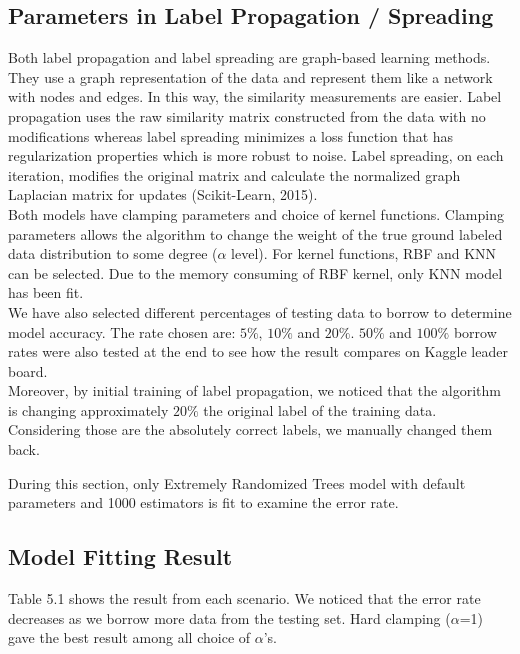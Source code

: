 \documentclass[11pt]{article}
\begin{document}
\subsection{Parameters in Label Propagation / Spreading}
Both label propagation and label spreading are graph-based learning methods. They use a graph representation of the data and represent them like a network with nodes and edges. In this way, the similarity measurements are easier. Label propagation uses the raw similarity matrix constructed from the data with no modifications whereas label spreading minimizes a loss function that has regularization properties which is more robust to noise. Label spreading, on each iteration, modifies the original matrix and calculate the normalized graph Laplacian matrix for updates (Scikit-Learn, 2015). \\

\noindent Both models have clamping parameters and choice of kernel functions. Clamping parameters allows the algorithm to change the weight of the true ground labeled data distribution to some degree ($\alpha$ level). For kernel functions, RBF and KNN can be selected. Due to the memory consuming of RBF kernel, only KNN model has been fit. \\

\noindent We have also selected different percentages of testing data to borrow to determine model accuracy. The rate chosen are: $5\%$, $10\%$ and $20\%$. $50\%$ and $100\%$ borrow rates were also tested at the end to see how the result compares on Kaggle leader board. \\

\noindent Moreover, by initial training of label propagation, we noticed that the algorithm is changing approximately $20\%$ the original label of the training data. Considering those are the absolutely correct labels, we manually changed them back.

\noindent During this section, only Extremely Randomized Trees model with default parameters and 1000 estimators is fit to examine the error rate. \\

\subsection{Model Fitting Result}

Table 5.1 shows the result from each scenario. We noticed that the error rate decreases as we borrow more data from the testing set. Hard clamping ($\alpha$=1) gave the best result among all choice of $\alpha$'s.
\end{document}
